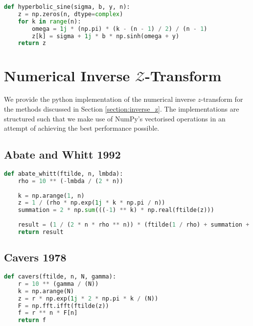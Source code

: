 \begin{appendices}
\begin{lstlisting}[language=Python, caption= Implementation of the conformal mapping (Equation \ref{equation:conformal_mapping}) from $-\frac{\pi}{2} \leq \omega \leq \frac{\pi}{2}$.]
def hyperbolic_sine(sigma, b, y, n):
    z = np.zeros(n, dtype=complex)
    for k in range(n):
        omega = 1j * (np.pi) * (k - (n - 1) / 2) / (n - 1)
        z[k] = sigma + 1j * b * np.sinh(omega + y)
    return z
\end{lstlisting}

\newpage
\section{Numerical Inverse $\mathcal{Z}$-Transform}
We provide the python implementation of the numerical inverse $z$-transform for the methods discussed in Section \ref{section:inverse_z}. The implementations are structured such that we make use of NumPy's vectorised operations in an attempt of achieving the best performance possible.

\subsection{Abate and Whitt 1992}
\begin{lstlisting}[language=Python, caption= Implementation of \citet{AbateWhitt1992a, AbateWhitt1992b}'s NIZT (Equation \ref{eq:aw_inversion}).]
def abate_whitt(ftilde, n, lmbda):
    rho = 10 ** (-lmbda / (2 * n))
    
    k = np.arange(1, n)
    z = 1 / (rho * np.exp(1j * k * np.pi / n))
    summation = 2 * np.sum(((-1) ** k) * np.real(ftilde(z)))
    
    result = (1 / (2 * n * rho ** n)) * (ftilde(1 / rho) + summation + ((-1) ** n) * ftilde(-1 / rho))
    return result
\end{lstlisting}

\subsection{Cavers 1978}
\begin{lstlisting}[language=Python, caption= Implementation of \citet{Cavers1978FFT} FFT NIZT (Equation \ref{cavers})]
def cavers(ftilde, n, N, gamma):
    r = 10 ** (gamma / (N))
    k = np.arange(N)
    z = r * np.exp(1j * 2 * np.pi * k / (N))
    F = np.fft.ifft(ftilde(z))
    f = r ** n * F[n]
    return f
\end{lstlisting}


\end{appendices}
